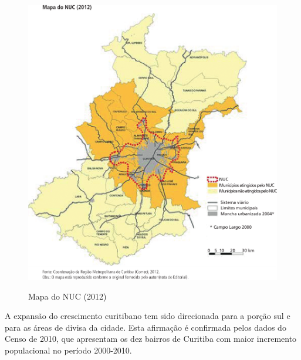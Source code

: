	\begin{figure}
		\centering
		\caption{Mapa do NUC (2012)}
		\includegraphics[width=1.0\linewidth]{img/costa2015a_03}
		\label{fig:costa2015a_03}
	\end{figure}
    
    A expansão do crescimento curitibano tem sido direcionada para a porção sul e para as áreas de divisa da cidade. Esta afirmação é confirmada pelos dados do Censo de 2010, que apresentam os dez bairros de Curitiba com maior incremento populacional no período 2000-2010.
    
